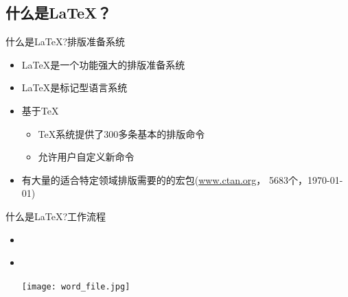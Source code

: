 \documentclass[xcolor=svgnames, t]{ctexbeamer}
\begin{document}
\subsection[是什么？]{什么是\LaTeX ？}\label{sec01-02}
\begin{frame}[t]{什么是\LaTeX?}{排版准备系统}
  \stretchon
  \begin{itemize}
  \item \LaTeX{}是一个功能强大的排版准备系统
  \item \LaTeX{}是标记型语言系统
  \item 基于\TeX
    \begin{itemize}
    \item \TeX{}系统提供了300多条基本的排版命令
    \item 允许用户自定义新命令
    \end{itemize}
  \item 有大量的适合特定领域排版需要的的宏包(\url{www.ctan.org}，
    \alert{5683}个，\today )
  \end{itemize}
  \stretchoff
\end{frame}

\begin{frame}[t]{什么是\LaTeX?}{工作流程}
  \begin{itemize}
  \item \wysiwym\\[4ex]
    \begin{center}
    \end{center}
    \vspace{4ex}
  \item \wysiwyg\\[4ex]
    \begin{center}
      \texttt{[image: word\_file.jpg]}
    \end{center}
  \end{itemize}
\end{frame}
\end{document}
